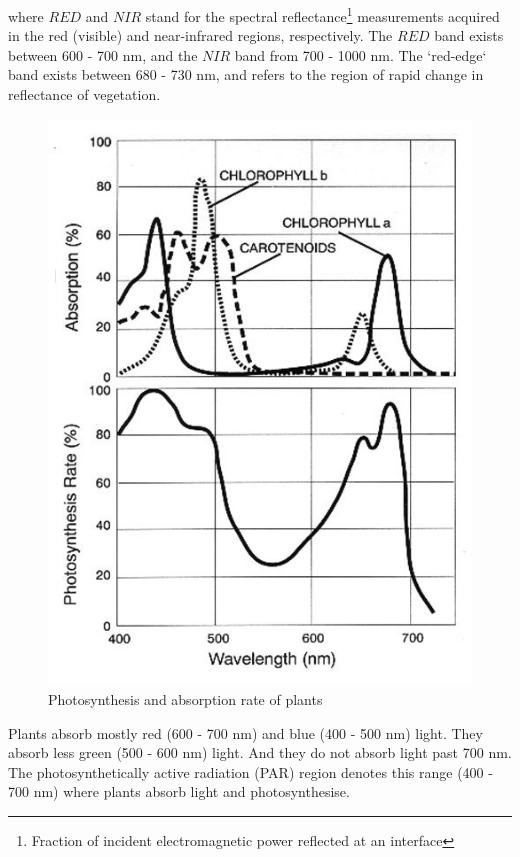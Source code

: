 where $RED$ and $NIR$ stand for the spectral reflectance\footnote{Fraction of incident electromagnetic power reflected at an interface} measurements acquired in the red (visible) and near-infrared regions, respectively. The $RED$ band exists between 600 - 700 nm, and the $NIR$ band from 700 - 1000 nm. The `red-edge` band exists between 680 - 730 nm, and refers to the region of rapid change in reflectance of vegetation.

\begin{figure}[H]
\centering
\includegraphics[scale=0.5]{images/chlorophyll.jpg}
\centering
\caption{Photosynthesis and absorption rate of plants \cite{ndvi_wiki}}
\label{fig:chlorophyll}
\end{figure}

Plants absorb mostly red (600 - 700 nm) and blue (400 - 500 nm) light. They absorb less green (500 - 600 nm) light. And they do not absorb light past 700 nm. The photosynthetically active radiation (PAR) region denotes this range (400 - 700 nm) where plants absorb light and photosynthesise.

